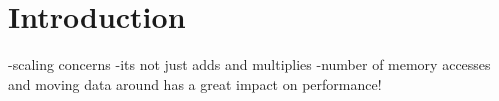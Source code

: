 \section{Introduction}\label{sec:dspmv-intro}
-scaling concerns
-its not just adds and multiplies
-number of memory accesses and moving data around has a great impact on performance!

